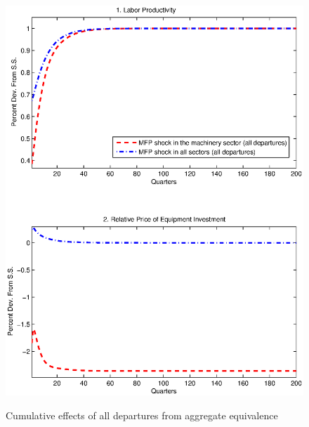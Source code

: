 \documentclass[12pt,fleqn]{article}
\begin{document}
\begin{figure}[tbp] \caption{Cumulative effects of all departures
from aggregate equivalence} \center \label{figure_test}
\includegraphics[scale=0.9]{figure_test.ps}
\end{figure}
\end{document}

